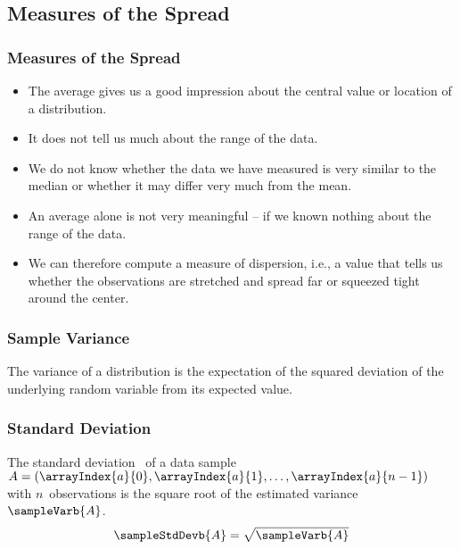 \documentclass[aspectratio=169,mathserif,notheorems]{beamer}%
\begin{document}
\subsection{Measures of the Spread}%
%
\begin{frame}%
\frametitle{Measures of the Spread}%
\begin{itemize}%
\item The average gives us a good impression about the central value or location of a distribution.%
\item<2-> It does not tell us much about the range of the data.%
\item<3-> We do not know whether the data we have measured is very similar to the median or whether it may differ very much from the mean.%
\item<4-> An average alone is not very meaningful -- if we known nothing about the range of the data.%
\item<5-> We can therefore compute a measure of dispersion, i.e., a value that tells us whether the observations are stretched and spread far or squeezed tight around the center.%
\end{itemize}%
\end{frame}%
%
\begin{frame}%
\frametitle{Sample Variance}%
\begin{definition*}[Variance]%
The variance of a distribution is the expectation of the squared deviation of the underlying random variable from its expected value.%
\end{definition*}%
%
\end{frame}%
%
\begin{frame}%
\frametitle{Standard Deviation}%
\begin{definition*}%
\sloppy%
The standard deviation~ of a data sample~$A=(\arrayIndex{a}{0},\arrayIndex{a}{1}, \dots, \arrayIndex{a}{n-1})$ with $n$~observations is the square root of the estimated variance~$\sampleVarb{A}$.%
\begin{equation}%
\sampleStdDevb{A} = \sqrt{\sampleVarb{A}}%
\nonumber%
\end{equation}%
\end{definition*}\fussy%
\end{frame}%
\end{document}
